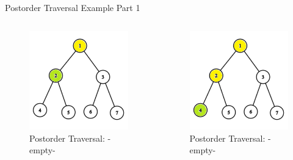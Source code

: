 \documentclass[aspectratio=169]{beamer}%
\begin{document}
\begin{frame}{Postorder Traversal Example Part 1}
\begin{columns}
\begin{column}{0.32\textwidth}
\begin{figure}
                \includegraphics[width = .9\linewidth]{tree-post 2.png}
                \caption{Postorder Traversal: -empty-}
            \end{figure}
        \end{column}
        \hfill
        \begin{column}{0.32\textwidth}
            \begin{figure}
                \centering
                \includegraphics[width = .9\linewidth]{tree-post 3.png}
                \caption{Postorder Traversal: -empty-}
            \end{figure}
        \end{column}
    \end{columns}
\end{frame}
\end{document}

